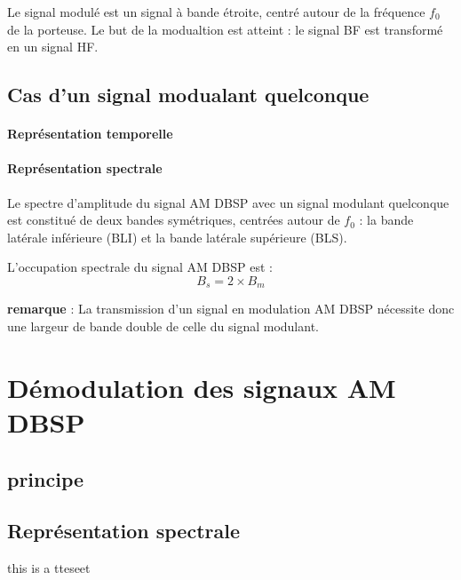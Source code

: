 \documentclass[12pt,a4paper,hidelinks,oneside]{book}
\begin{document}
Le signal modulé est un signal à bande étroite, centré autour de la fréquence $f_{0}$ de la porteuse. Le but
de la modualtion est atteint : le signal BF est transformé en un signal HF.

\subsection{Cas d’un signal modualant quelconque}
\paragraph{Représentation temporelle}
\paragraph{Représentation spectrale }
Le spectre d’amplitude du signal AM DBSP avec un signal modulant quelconque est constitué de deux
bandes symétriques, centrées autour de $f_{0}$ : la bande latérale inférieure (BLI) et la bande latérale
supérieure (BLS).

L’occupation spectrale du signal AM DBSP est :
\begin{equation}
B_{s}=2\times B_{m}
\end{equation}

\noindent\textbf{remarque} : La transmission d’un signal en modulation AM DBSP nécessite donc une largeur de bande double de
celle du signal modulant.

\section{Démodulation des signaux AM DBSP}
\subsection{principe}
\subsection{Représentation spectrale}


this is a tteseet
\end{document}
